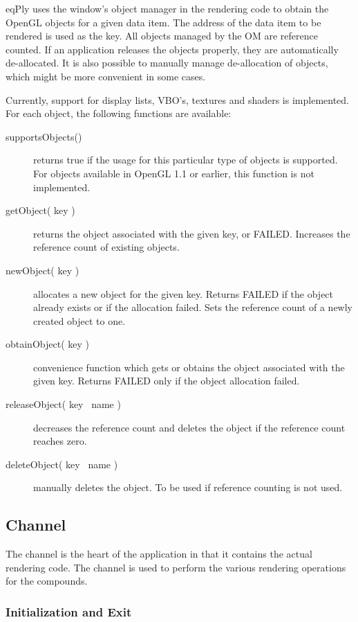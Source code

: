 \documentclass[10pt,a4]{scrartcl}
\begin{document}
\textsf{eqPly} uses the window's object manager in the rendering code to
obtain the OpenGL objects for a given data item. The address of the data
item to be rendered is used as the key. All objects managed by the OM
are reference counted. If an application releases the objects properly,
they are automatically de-allocated. It is also possible to manually
manage de-allocation of objects, which might be more convenient in some
cases.

Currently, support for display lists, VBO's, textures and shaders is
implemented. For each object, the following functions are available:

\begin{description}
\item[supportsObjects()] returns true if the usage for this particular
  type of objects is supported. For objects available in OpenGL 1.1 or
  earlier, this function is not implemented.
\item[getObject( key )] returns the object associated with the given
  key, or FAILED. Increases the reference count of existing objects.
\item[newObject( key )] allocates a new object for the given
  key. Returns FAILED if the object already exists or if the allocation
  failed. Sets the reference count of a newly created object to one.
\item[obtainObject( key )] convenience function which gets or obtains
  the object associated with the given key. Returns FAILED only if the
  object allocation failed.
\item[releaseObject( key \textbar\ name )] decreases the reference count and
  deletes the object if the reference count reaches zero.
\item[deleteObject( key \textbar\ name )] manually deletes the object. To be
  used if reference counting is not used.
\end{description}


\subsection{Channel}

The channel is the heart of the application in that it contains the
actual rendering code. The channel is used to perform the various rendering
operations for the compounds.

\subsubsection{Initialization and Exit}
\end{document}
